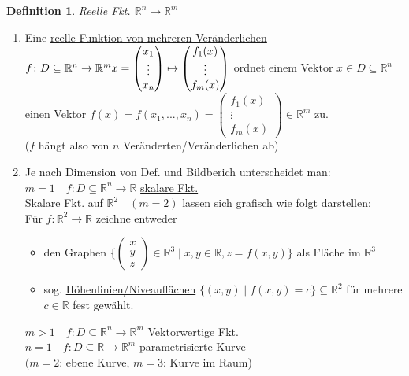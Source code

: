 \documentclass[a4paper,11pt]{article}
\newtheorem{definition}{Definition}[section]
\begin{document}
\begin{definition}
	Reelle Fkt. $\mathbb{R}^n\rightarrow\mathbb{R}^m$
\end{definition}
\begin{enumerate}[label=\alph*)]
	\item Eine \underline{reelle Funktion von mehreren Veränderlichen} $f\colon D\subseteq\mathbb{R}^n\rightarrow\mathbb{R}^m \\
	x=\begin{pmatrix}x_1\\\vdots\\x_n\end{pmatrix}\mapsto\begin{pmatrix}f_1(x)\\\vdots\\f_m(x)\end{pmatrix}$ ordnet einem Vektor $x\in D\subseteq\mathbb{R}^n$ \\
	einen Vektor $f(x)=f(x_1,...,x_n)=\begin{pmatrix}f_1(x)\\\vdots\\f_m(x)\end{pmatrix}\in\mathbb{R}^m$ zu. \\
	($f$ hängt also von $n$ Veränderten/Veränderlichen ab)
	\item Je nach Dimension von Def. und Bildberich unterscheidet man: \\
	$m=1\quad f\colon D\subseteq\mathbb{R}^n\rightarrow\mathbb{R}$ \underline{skalare Fkt.} \\
	Skalare Fkt. auf $\mathbb{R}^2\quad(m=2)$ lassen sich grafisch wie folgt darstellen: \\
	Für $f\colon\mathbb{R}^2\rightarrow\mathbb{R}$ zeichne entweder
		\begin{itemize}
			\item den Graphen $\{\begin{pmatrix}x\\y\\z\end{pmatrix}\in\mathbb{R}^3\mid x,y\in\mathbb{R},z=f(x,y)\}$ als Fläche im $\mathbb{R}^3$
			\item sog. \underline{Höhenlinien/Niveauflächen} $\{(x,y)\mid f(x,y)=c\}\subseteq\mathbb{R}^2$ für mehrere $c\in\mathbb{R}$ fest gewählt.
		\end{itemize}
	$m>1\quad f\colon D\subseteq\mathbb{R}^n\rightarrow\mathbb{R}^m$ \underline{Vektorwertige Fkt.} \\
	$n=1\quad f\colon D\subseteq\mathbb{R}\rightarrow\mathbb{R}^m$ \underline{parametrisierte Kurve} \\
	$(m=2$: ebene Kurve, $m=3$: Kurve im Raum)
\end{enumerate}
\end{document}

